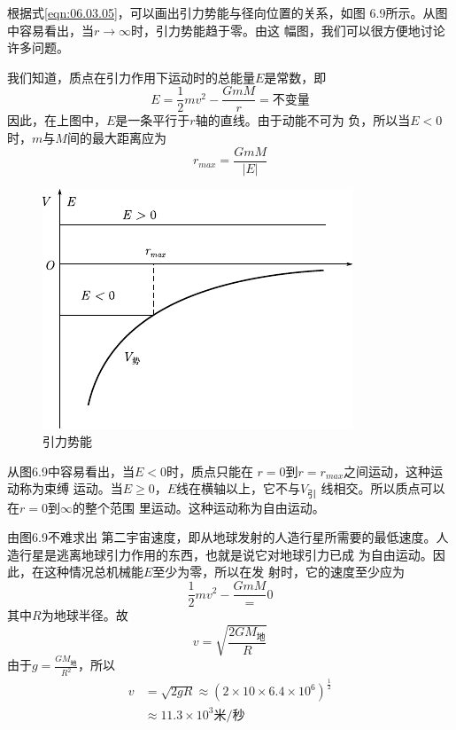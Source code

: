 根据式\eqref{eqn:06.03.05}，可以画出引力势能与径向位置的关系，如图
6.9所示。从图中容易看出，当$ r \to \infty $时，引力势能趋于零。由这
幅图，我们可以很方便地讨论许多问题。

我们知道，质点在引力作用下运动时的总能量$ E $是常数，即
\begin{equation*}
 E = \frac { 1 } { 2 } m v ^ { 2 } - \frac { G m M } { r } = \text{不变量}
\end{equation*}
因此，在上图中，$ E $是一条平行于$ r $轴的直线。由于动能不可为
负，所以当$ E < 0 $时，$ m $与$ M $间的最大距离应为
\begin{equation*}
 r _ { max } = \frac { G m M } { | E | }
\end{equation*}
\begin{figure}
    \vspace{-1.3em}
    \centering
    \includegraphics{figure/fig06.09}
    \caption{引力势能}
    \label{fig:06.09}
\end{figure}
从图6.9中容易看出，当$ E < 0 $时，质点只能在
$ r = 0 $到$ r = r _ { max } $之间运动，这种运动称为束缚
运动。当$ E \geqslant 0 $，$ E $线在横轴以上，它不与$ V_\text{引} $
线相交。所以质点可以在$ r = 0 $到$ \infty $的整个范围
里运动。这种运动称为自由运动。

由图6.9不难求出
第二宇宙速度，即从地球发射的人造行星所需要的最低速度。人
造行星是逃离地球引力作用的东西，也就是说它对地球引力已成
为自由运动。因此，在这种情况总机械能$ E $至少为零，所以在发
射时，它的速度至少应为
\begin{equation*}
 \frac { 1 } { 2 } m v ^ { 2 } - \frac { G m M } = 0
\end{equation*}
其中$ R $为地球半径。故
\begin{equation*}
 v = \sqrt{\frac { 2 G M _ \text{地} } { R } }
\end{equation*}
由于$ g = \frac { G M _ \text{地} } { R ^ { 2 } } $，所以
\clearpage
\begin{equation*}
 \begin{aligned}
 v &= \sqrt { 2 g R } \approx ( 2 \times 10 \times 6.4 \times 10 ^ { 6 } ) ^ { \frac { 1 } { 2 } } \\
 &\approx 11.3 \times 10 ^ { 3 } \text{米/秒}
 \end{aligned}
\end{equation*}

